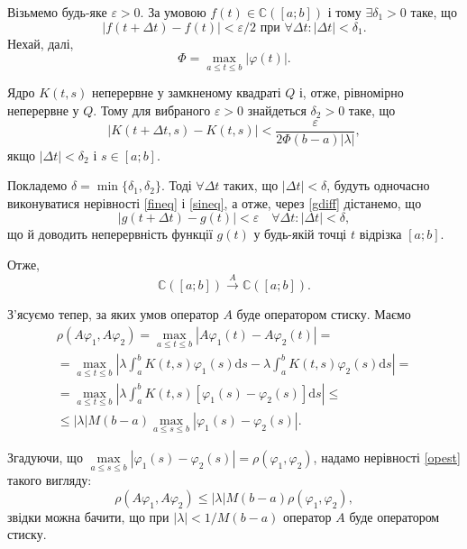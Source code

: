 \documentclass[14pt,twoside]{extreport}
\theoremstyle{mystyle}
\numberwithin{equation}{chapter}
\newcommand{\cab}{\mathbb{C}([a; b])}
\begin{document}
Візьмемо будь-яке $\varepsilon > 0$. За умовою $f(t) \in \cab$ і тому $\exists \delta_1 >0$ таке, що
\begin{equation}\label{fineq}
 |f(t+\Delta t) - f(t)|<\varepsilon/2\textrm{ при } \forall \Delta t: |\Delta t| < \delta_1.
\end{equation}
Нехай, далі,
\[
 \Phi = \max\limits_{a \leqslant t \leqslant b} |\varphi (t)|.
\]

Ядро $K(t, s)$ неперервне у замкненому квадраті $Q$ і, отже, рівномірно неперервне у $Q$. Тому для вибраного $\varepsilon>0$ знайдеться $\delta_2 > 0$ таке, що
\begin{equation}\label{sineq}
 |K(t+\Delta t, s) -K(t, s)|<\dfrac{\varepsilon}{2\Phi(b-a)|\lambda|},
\end{equation}
якщо $|\Delta t|< \delta_2$ і $s\in [a; b]$.

Покладемо $\delta = \min\{\delta_1, \delta_2\}$. Тоді $\forall \Delta t$ таких, що $|\Delta t| < \delta$, будуть одночасно виконуватися нерівності \eqref{fineq} і \eqref{sineq}, а отже, через \eqref{gdiff} дістанемо, що
\[
 |g(t+ \Delta t) - g(t)|<\varepsilon\quad \forall \Delta t: |\Delta t|< \delta,
\]
що й доводить неперервність функції $g(t)$ у будь-якій точці $t$ відрізка $[a; b]$.

Отже,
\[
 \cab \xrightarrow{A} \cab.
\]

З'ясуємо тепер, за яких умов оператор $A$ буде оператором стиску. Маємо
\begin{multline}\label{opest}
 \rho(A\varphi_1, A\varphi_2) = \max\limits_{a \leqslant t \leqslant b} |A\varphi_1(t) - A\varphi_2(t)|=\\
 = \max\limits_{a \leqslant t \leqslant b} \left|\lambda \int_{a}^{b} K(t, s) \varphi_1(s) \mathrm{d}s - \lambda \int_{a}^{b} K(t, s) \varphi_2(s) \mathrm{d}s\right|=\\
 = \max\limits_{a \leqslant t \leqslant b} \left|\lambda \int_{a}^{b} K(t, s) [\varphi_1(s) - \varphi_2(s)] \mathrm{d}s\right| \leqslant\\
 \leqslant |\lambda| M (b-a) \max\limits_{a \leqslant s \leqslant b} |\varphi_1(s) - \varphi_2(s)|.
\end{multline}

Згадуючи, що $\max\limits_{a \leqslant s \leqslant b} |\varphi_1(s) - \varphi_2(s)| = \rho(\varphi_1, \varphi_2)$, надамо нерівності \eqref{opest} такого вигляду:
\[
 \rho(A\varphi_1, A\varphi_2) \leqslant |\lambda| M (b-a) \rho(\varphi_1, \varphi_2),
\]
звідки можна бачити, що при $|\lambda| < 1/M(b-a)$ оператор $A$ буде оператором стиску.
\end{document}

